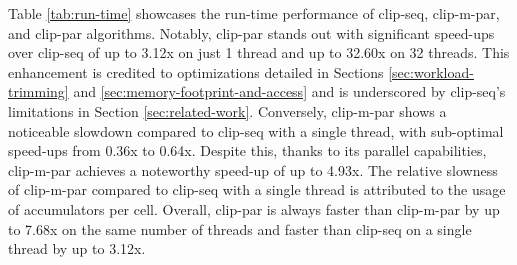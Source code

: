 \documentclass{egpubl}
\begin{document}
Table \ref{tab:run-time} showcases the run-time performance of clip-seq, clip-m-par, and clip-par algorithms. Notably, clip-par stands out with significant speed-ups over clip-seq of up to 3.12x on just 1 thread and up to 32.60x on 32 threads. This enhancement is credited to optimizations detailed in Sections \ref{sec:workload-trimming} and \ref{sec:memory-footprint-and-access} and is underscored by clip-seq's limitations in Section \ref{sec:related-work}. Conversely, clip-m-par shows a noticeable slowdown compared to clip-seq with a single thread, with sub-optimal speed-ups from 0.36x to 0.64x. Despite this, thanks to its parallel capabilities, clip-m-par achieves a noteworthy speed-up of up to 4.93x. The relative slowness of clip-m-par compared to clip-seq with a single thread is attributed to the usage of accumulators per cell. Overall, clip-par is always faster than clip-m-par by up to 7.68x on the same number of threads and faster than clip-seq on a single thread by up to 3.12x.
\end{document}
